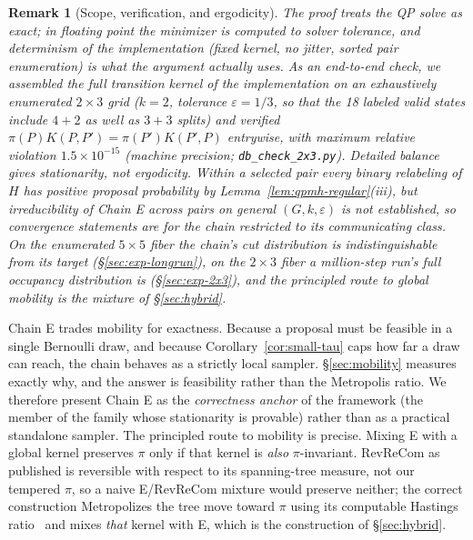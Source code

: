 \documentclass[11pt]{article}
\newtheorem{remark}{Remark}[section]
\begin{document}
\begin{remark}[Scope, verification, and ergodicity]\label{rem:qpmh-scope}
The proof treats the QP solve as exact; in floating point the
minimizer is computed to solver tolerance, and determinism of the
implementation (fixed kernel, no jitter, sorted pair enumeration) is
what the argument actually uses. As an end-to-end check, we assembled
the full transition kernel of the implementation on an exhaustively
enumerated $2 \times 3$ grid ($k = 2$, tolerance $\varepsilon = 1/3$,
so that the 18 labeled valid states include $4{+}2$ as well as
$3{+}3$ splits) and verified
$\pi(P)K(P,P') = \pi(P')K(P',P)$ entrywise, with maximum relative
violation $1.5 \times 10^{-15}$ (machine precision;
\texttt{db\_check\_2x3.py}). Detailed balance
gives stationarity, not ergodicity. Within a selected pair every
binary relabeling of $H$ has positive proposal probability by
Lemma~\ref{lem:qpmh-regular}(iii), but irreducibility of Chain E
across pairs on general $(G, k, \varepsilon)$ is not established, so
convergence statements are for the chain restricted to its
communicating class. On the enumerated $5 \times 5$ fiber the chain's cut distribution is
indistinguishable from its target (\S\ref{sec:exp-longrun}), on the
$2 \times 3$ fiber a million-step run's full occupancy distribution
is (\S\ref{sec:exp-2x3}), and the principled route to global mobility
is the mixture of \S\ref{sec:hybrid}.
\end{remark}

Chain E trades mobility for exactness. Because a proposal must be
feasible in a single Bernoulli draw, and because
Corollary~\ref{cor:small-tau} caps how far a draw can reach, the
chain behaves as a strictly local sampler. \S\ref{sec:mobility}
measures exactly why, and the answer is feasibility rather than the
Metropolis ratio. We therefore present Chain E as the
\emph{correctness anchor} of the framework (the member of the family
whose stationarity is provable) rather than as a practical standalone
sampler. The principled route to mobility is precise. Mixing E with a
global kernel preserves $\pi$ only if that kernel is \emph{also}
$\pi$-invariant. RevReCom as published is reversible with respect to
its spanning-tree measure, not our tempered $\pi$, so a naive
E/RevReCom mixture would preserve neither; the correct construction
Metropolizes the tree move toward $\pi$ using its computable Hastings
ratio~\cite{cannon2022spanning,autry2023metropolized} and mixes
\emph{that} kernel with E, which is the construction of
\S\ref{sec:hybrid}.
\end{document}
